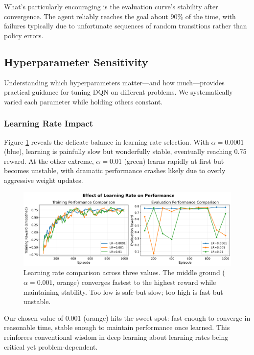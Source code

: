 \documentclass[conference]{IEEEtran}
\begin{document}
What's particularly encouraging is the evaluation curve's stability after convergence. The agent reliably reaches the goal about 90\% of the time, with failures typically due to unfortunate sequences of random transitions rather than policy errors.

\subsection{Hyperparameter Sensitivity}

Understanding which hyperparameters matter—and how much—provides practical guidance for tuning DQN on different problems. We systematically varied each parameter while holding others constant.

\subsubsection{Learning Rate Impact}

Figure \ref{fig:lr} reveals the delicate balance in learning rate selection. With $\alpha=0.0001$ (blue), learning is painfully slow but wonderfully stable, eventually reaching 0.75 reward. At the other extreme, $\alpha=0.01$ (green) learns rapidly at first but becomes unstable, with dramatic performance crashes likely due to overly aggressive weight updates.

\begin{figure}[htbp]
\centerline{\includegraphics[width=\columnwidth]{images/experiment_learning_rate.png}}
\caption{Learning rate comparison across three values. The middle ground ($\alpha=0.001$, orange) converges fastest to the highest reward while maintaining stability. Too low is safe but slow; too high is fast but unstable.}
\label{fig:lr}
\end{figure}

Our chosen value of 0.001 (orange) hits the sweet spot: fast enough to converge in reasonable time, stable enough to maintain performance once learned. This reinforces conventional wisdom in deep learning about learning rates being critical yet problem-dependent.
\end{document}
